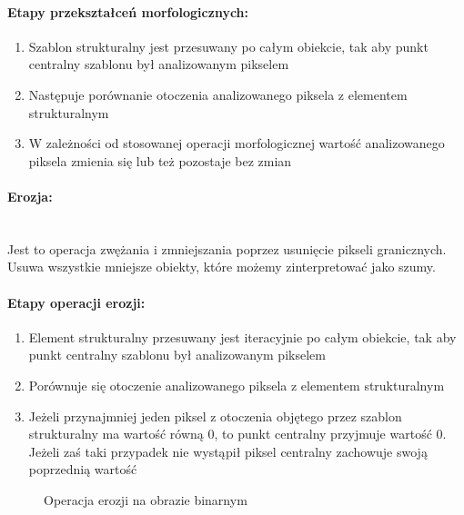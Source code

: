 \documentclass[a4paper,12pt,twoside,openany]{report}
\newcommand{\ImgPath}{.}
\begin{document}
\paragraph{Etapy przekształceń morfologicznych:}
\begin{enumerate}
	\item Szablon strukturalny jest przesuwany po całym obiekcie, tak aby punkt centralny szablonu był analizowanym pikselem
	\item Następuje porównanie otoczenia analizowanego piksela z elementem strukturalnym
	\item W zależności od stosowanej operacji morfologicznej wartość analizowanego piksela zmienia się lub też pozostaje bez zmian
\end{enumerate}

\paragraph{Erozja:}\mbox{} \\
Jest to operacja zwężania i zmniejszania poprzez usunięcie pikseli granicznych. Usuwa wszystkie mniejsze obiekty, które możemy zinterpretować jako szumy. 

\paragraph{Etapy operacji erozji:}
\begin{enumerate}
	\item Element strukturalny przesuwany jest iteracyjnie po całym obiekcie,  tak aby punkt centralny szablonu był analizowanym pikselem
	\item Porównuje się otoczenie analizowanego piksela z elementem strukturalnym
	\item  Jeżeli przynajmniej jeden piksel z otoczenia objętego przez szablon strukturalny ma wartość równą 0, to punkt centralny przyjmuje wartość 0. Jeżeli zaś taki przypadek nie wystąpił piksel centralny zachowuje swoją poprzednią wartość
\end{enumerate}

\begin{figure}[H]
	\centering
	\caption{Operacja erozji na obrazie binarnym}
\end{figure}
\end{document}
